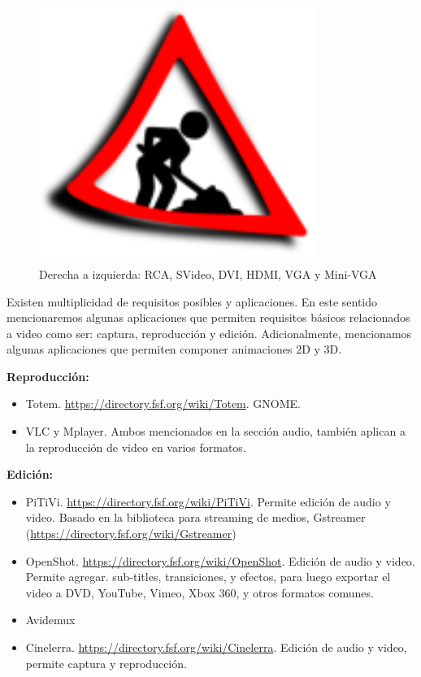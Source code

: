 \documentclass[12pt]{article}
\begin{document}
\begin{figure}[h]
\centering
\includegraphics[width=0.8\textwidth]{UN_CONSTRUCTION_2ss.png}
\renewcommand{\figurename}{Fig.}
\caption{Derecha a izquierda: RCA, SVideo, DVI, HDMI, VGA y Mini-VGA}
\label{contexto:figura}
\end{figure}

Existen multiplicidad de requisitos posibles y aplicaciones. En este sentido 
mencionaremos algunas aplicaciones que permiten requisitos básicos relacionados
a video como ser: captura, reproducción y edición. Adicionalmente, mencionamos 
algunas aplicaciones que permiten componer animaciones 2D y 3D. 

{\bf Reproducción:}
\begin{itemize}
\item Totem.   \url{https://directory.fsf.org/wiki/Totem}. GNOME. 
\item VLC y Mplayer.  Ambos mencionados en la sección audio, también aplican 
a la reproducción de video en varios formatos.  
\end{itemize}

{\bf Edición:}
\begin{itemize}
\item PiTiVi. \url{https://directory.fsf.org/wiki/PiTiVi}.
Permite edición de audio y video. Basado en la biblioteca para
streaming de medios, Gstreamer (\url{https://directory.fsf.org/wiki/Gstreamer})
\item OpenShot. \url{https://directory.fsf.org/wiki/OpenShot}. Edición 
de audio y video. Permite agregar. sub-titles, transiciones, y efectos, para 
luego exportar el video a DVD, YouTube, Vimeo, Xbox 360, y otros formatos comunes.
\item Avidemux 
\item Cinelerra. \url{https://directory.fsf.org/wiki/Cinelerra}. Edición de audio
y video, permite captura y reproducción. 
\end{itemize}
\end{document}
